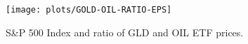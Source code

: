 \documentclass[a4paper,12pt]{article}
\begin{document}
\begin{figure}[!htb]
\centering
\texttt{[image: plots/GOLD-OIL-RATIO-EPS]}
\caption{S\&P 500 Index and ratio of GLD and OIL ETF prices.}
\label{fig:gold-oil-ratio}
\end{figure}
\end{document}
